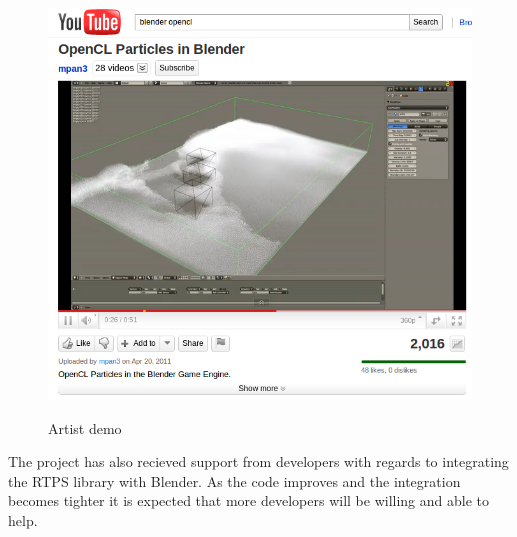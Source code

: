 \begin{figure}[!htc]
 		\centering
		\includegraphics[scale=0.5]{figures/youtube.png}
		\label{fig:logic}
        \caption{ Artist demo }
\end{figure}

The project has also recieved support from developers with regards to
integrating the RTPS library with Blender. As the code improves and the
integration becomes tighter it is expected that more developers will be willing
and able to help.


